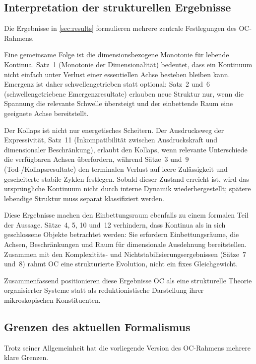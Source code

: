 \subsection{Interpretation der strukturellen Ergebnisse}

Die Ergebnisse in \cref{sec:results} formulieren mehrere zentrale Festlegungen des
OC-Rahmens.

Eine gemeinsame Folge ist die dimensionsbezogene Monotonie für lebende
Kontinua.
Satz~1 (Monotonie der Dimensionalität) bedeutet, dass ein Kontinuum nicht einfach
unter Verlust einer essentiellen Achse bestehen bleiben kann.
Emergenz ist daher schwellengetrieben statt optional:
Satz~2 und~6 (schwellengetriebene Emergenzresultate) erlauben neue Struktur
nur, wenn die Spannung die relevante Schwelle übersteigt und der
einbettende Raum eine geeignete Achse bereitstellt.

Der Kollaps ist nicht nur energetisches Scheitern. Der Ausdrucksweg der
Expressivität, Satz~11 (Inkompatibilität zwischen Ausdruckskraft und dimensionaler
Beschränkung), erlaubt den Kollaps, wenn relevante Unterschiede die verfügbaren
Achsen überfordern, während Sätze~3 und~9 (Tod-/Kollapsresultate) den
terminalen Verlust auf leere Zulässigkeit und gescheiterte stabile Zyklen festlegen.
Sobald dieser Zustand erreicht ist, wird das
ursprüngliche Kontinuum nicht durch interne Dynamik wiederhergestellt; spätere
lebendige Struktur muss separat klassifiziert werden.

Diese Ergebnisse machen den Einbettungsraum ebenfalls zu einem formalen Teil der
Aussage. Sätze~4, 5, 10 und~12 verhindern, dass Kontinua als in sich
geschlossene Objekte betrachtet werden: Sie erfordern Einbettungsräume, die
Achsen, Beschränkungen und Raum für dimensionale Ausdehnung bereitstellen.
Zusammen mit den Komplexitäts- und Nichtstabilisierungsergebnissen
(Sätze~7 und~8) rahmt OC eine strukturierte Evolution, nicht ein fixes
Gleichgewicht.

Zusammenfassend positionieren diese Ergebnisse OC als eine strukturelle Theorie
organisierter Systeme statt als reduktionistische Darstellung ihrer mikroskopischen
Konstituenten.

\subsection{Grenzen des aktuellen Formalismus}

Trotz seiner Allgemeinheit hat die vorliegende Version des OC-Rahmens mehrere
klare Grenzen.


